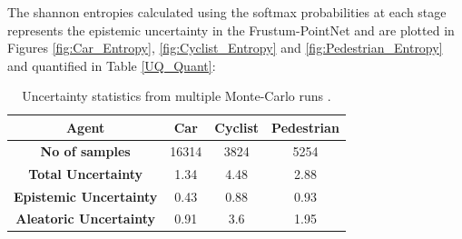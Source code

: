 \documentclass[10pt,twocolumn,letterpaper]{article}
\begin{document}
The shannon entropies calculated using the softmax probabilities at each stage represents the epistemic uncertainty in the Frustum-PointNet and are plotted in Figures \ref{fig:Car_Entropy}, \ref{fig:Cyclist_Entropy} and \ref{fig:Pedestrian_Entropy} and quantified in Table \ref{UQ_Quant}: 
\begin{table}[!htbp]
    \centering
    \begin{tabular}{|c|c|c|c|}
        \hline \textbf{Agent} & \textbf{Car} & \textbf{Cyclist} & \textbf{Pedestrian}  \\
        \hline \textbf{No of samples} & 16314 & 3824 & 5254 \\
        \hline \textbf{Total Uncertainty} & 1.34  & 4.48 & 2.88 \\
        \hline \textbf{Epistemic Uncertainty} & 0.43 & 0.88 & 0.93 \\
        \hline \textbf{Aleatoric Uncertainty} & 0.91 & 3.6 & 1.95 \\
        \hline
    \end{tabular}
	\label{UQ_Quant}	
	\caption{Uncertainty statistics from multiple Monte-Carlo runs \label{tab:Uncertianty Statistics}.}
\end{table}
\end{document}

